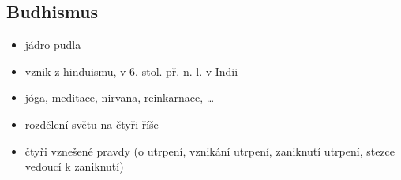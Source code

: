 \subsection{Budhismus}
\begin{itemize}
\item jádro pudla
\item vznik z hinduismu, v 6. stol. př. n. l. v Indii
\item jóga, meditace, nirvana, reinkarnace, \ldots
\item rozdělení světu na čtyři říše
\item čtyři vznešené pravdy (o utrpení, vznikání utrpení, zaniknutí utrpení, stezce vedoucí k zaniknutí)
\end{itemize}

